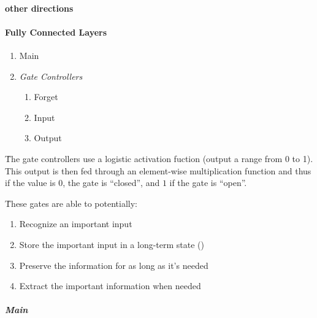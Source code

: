 



\paragraph{other directions}


\paragraph{Fully Connected Layers}


\begin{enumerate}[noitemsep,topsep=0pt]
	\item Main
	\item \textit{Gate Controllers}
	\begin{enumerate}[noitemsep,topsep=0pt]
		\item Forget
		\item Input
		\item Output
	\end{enumerate}
\end{enumerate}

\r{The gate controllers use a logistic activation fuction (output a range from 0 to 1). This output is then fed through an element-wise multiplication function and thus if the value is $0$, the gate is ``closed'', and $1$ if the gate is ``open''.}

\r{These gates are able to potentially:}

\begin{enumerate}[noitemsep,topsep=0pt]
	\item Recognize an important input
	\item Store the important input in a long-term state ()
	\item Preserve the information for as long as it's needed
	\item Extract the important information when needed
\end{enumerate}


\subparagraph{Main}

